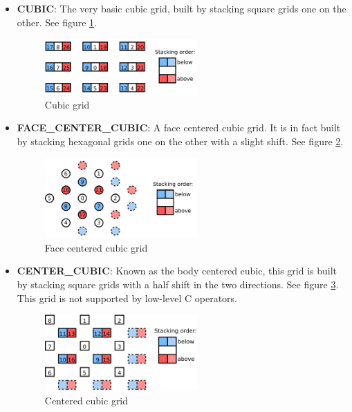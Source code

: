 \documentclass[a4paper,10pt,oneside]{article}
\begin{document}
\begin{itemize}
\item \textbf{CUBIC}: The very basic cubic grid, built by stacking square
grids one on the other. See figure \ref{fig:cubic_grid}.

\begin{figure}
\centering
\includegraphics[width=0.55\textwidth]{figures/cubic_grid.pdf}
\caption{Cubic grid}
\label{fig:cubic_grid}
\end{figure}

\item \textbf{FACE\_CENTER\_CUBIC}: A face centered cubic grid. It is in fact
built by stacking hexagonal grids one on the other with a slight shift. See
figure \ref{fig:fcc_grid}.

\begin{figure}
\centering
\includegraphics[width=0.55\textwidth]{figures/fcc_grid.pdf}
\caption{Face centered cubic grid}
\label{fig:fcc_grid}
\end{figure}

\item \textbf{CENTER\_CUBIC}: Known as the body centered cubic, this grid is
built by stacking square grids with a half shift in the two directions. See
figure \ref{fig:ccubic_grid}. This grid is not supported by low-level C
operators.

\begin{figure}
\centering
\includegraphics[width=0.55\textwidth]{figures/ccubic_grid.pdf}
\caption{Centered cubic grid}
\label{fig:ccubic_grid}
\end{figure}

\end{itemize}
\end{document}
